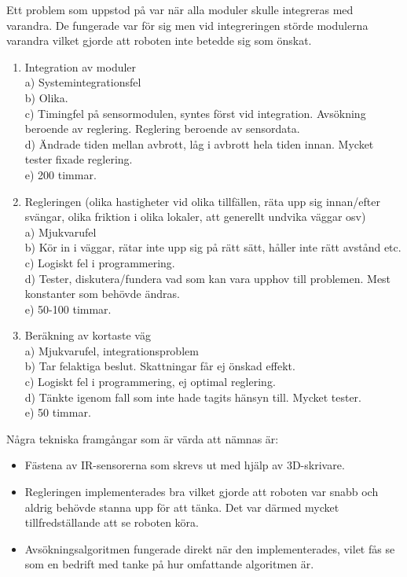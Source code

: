 \documentclass[11pt]{article}
\begin{document}
Ett problem som uppstod på var när alla moduler skulle integreras med varandra. De fungerade var för sig men vid integreringen störde modulerna varandra vilket gjorde att roboten inte betedde sig som önskat.

\begin{enumerate}
  
  \item Integration av moduler\\
  a) Systemintegrationsfel\\
  b) Olika. \\
  c) Timingfel på sensormodulen, syntes först vid integration. Avsökning beroende av reglering. Reglering beroende av sensordata.\\
  d) Ändrade tiden mellan avbrott, låg i avbrott hela tiden innan. Mycket tester fixade reglering.\\
  e) 200 timmar.
  
   \item Regleringen (olika hastigheter vid olika tillfällen, räta upp sig innan/efter svängar, olika friktion i olika lokaler, att generellt undvika väggar osv)\\
  a) Mjukvarufel \\
  b) Kör in i väggar, rätar inte upp sig på rätt sätt, håller inte rätt avstånd etc.\\
  c) Logiskt fel i programmering. \\
  d) Tester, diskutera/fundera vad som kan vara upphov till problemen. Mest konstanter som behövde ändras.\\
  e) 50-100 timmar.
  
  \item Beräkning av kortaste väg\\
  a) Mjukvarufel, integrationsproblem\\
  b) Tar felaktiga beslut. Skattningar får ej önskad effekt. \\
  c) Logiskt fel i programmering, ej optimal reglering.\\
  d) Tänkte igenom fall som inte hade tagits hänsyn till. Mycket tester.\\
  e) 50 timmar.
  
\end{enumerate}

Några tekniska framgångar som är värda att nämnas är:
\begin{itemize}
\item Fästena av IR-sensorerna som skrevs ut med hjälp av 3D-skrivare.
\item Regleringen implementerades bra vilket gjorde att roboten var snabb och aldrig behövde stanna upp för att tänka. Det var därmed mycket tillfredställande att se roboten köra. 
\item Avsökningsalgoritmen fungerade direkt när den implementerades, vilet fås se som en bedrift med tanke på hur omfattande algoritmen är. 
\end{itemize} 
\end{document}
